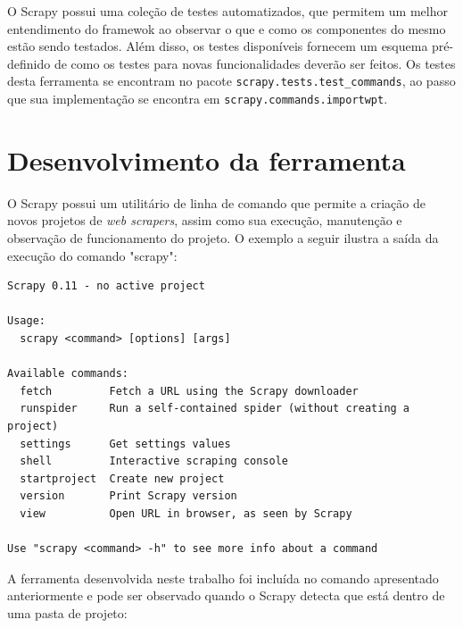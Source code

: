 O Scrapy possui uma coleção de testes automatizados, que permitem um melhor entendimento do framewok ao observar o que e como os componentes do mesmo estão sendo testados. Além disso, os testes disponíveis fornecem um esquema pré-definido de como os testes para novas funcionalidades deverão ser feitos. Os testes desta ferramenta se encontram no pacote \texttt{scrapy.tests.test\_commands}, ao passo que sua implementação se encontra em \texttt{scrapy.commands.importwpt}.

\section{Desenvolvimento da ferramenta}

O Scrapy possui um utilitário de linha de comando que permite a criação de novos projetos de \emph{web scrapers}, assim como sua execução, manutenção e observação de funcionamento do projeto. O exemplo a seguir ilustra a saída da execução do comando "scrapy":

\begin{lstlisting}
Scrapy 0.11 - no active project

Usage:
  scrapy <command> [options] [args]

Available commands:
  fetch         Fetch a URL using the Scrapy downloader
  runspider     Run a self-contained spider (without creating a project)
  settings      Get settings values
  shell         Interactive scraping console
  startproject  Create new project
  version       Print Scrapy version
  view          Open URL in browser, as seen by Scrapy

Use "scrapy <command> -h" to see more info about a command
\end{lstlisting}

A ferramenta desenvolvida neste trabalho foi incluída no comando apresentado anteriormente e pode ser observado quando o Scrapy detecta que está dentro de uma pasta de projeto:

